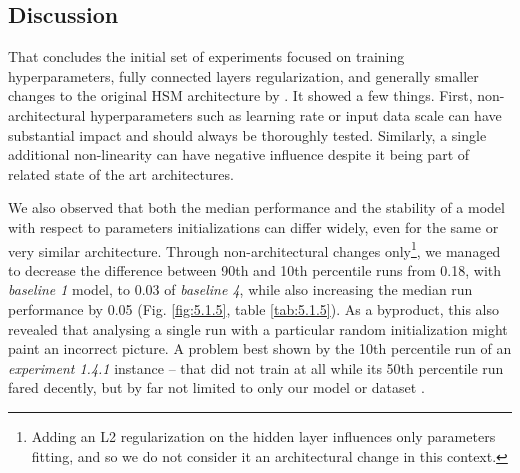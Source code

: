 \subsection{Discussion}
That concludes the initial set of experiments focused on training hyperparameters, fully connected layers regularization, and generally smaller changes to the original HSM architecture by \citeauthor{antolik}. It showed a few things. First, non-architectural hyperparameters such as learning rate or input data scale can have substantial impact and should always be thoroughly tested. Similarly, a single additional non-linearity can have negative influence despite it being part of related state of the art architectures. 

We also observed that both the median performance and the stability of a model with respect to parameters initializations can differ widely, even for the same or very similar architecture. Through non-architectural changes only\footnote{Adding an L2 regularization on the hidden layer influences only parameters fitting, and so we do not consider it an architectural change in this context.}, we managed to decrease the difference between 90th and 10th percentile runs from 0.18, with \textit{baseline 1} model, to 0.03 of \textit{baseline 4}, while also increasing the median run performance by 0.05 (Fig. \ref{fig:5.1.5}, table \ref{tab:5.1.5}). As a byproduct, this also revealed that analysing a single run with a particular random initialization might paint an incorrect picture. A problem best shown by the 10th percentile run of an \textit{experiment 1.4.1} instance -- that did not train at all while its 50th percentile run fared decently, but by far not limited to only our model or dataset \citep{2019arXiv190910447M}.

